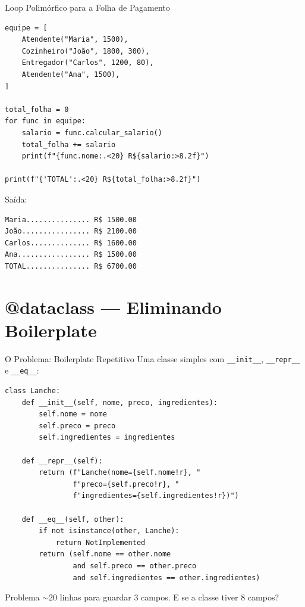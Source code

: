 \documentclass[aspectratio=169]{beamer}
\begin{document}
\begin{frame}[fragile,shrink=20]{Loop Polimórfico para a Folha de Pagamento}
  \begin{lstlisting}
equipe = [
    Atendente("Maria", 1500),
    Cozinheiro("João", 1800, 300),
    Entregador("Carlos", 1200, 80),
    Atendente("Ana", 1500),
]

total_folha = 0
for func in equipe:
    salario = func.calcular_salario()
    total_folha += salario
    print(f"{func.nome:.<20} R${salario:>8.2f}")

print(f"{'TOTAL':.<20} R${total_folha:>8.2f}")
  \end{lstlisting}

  Saída:
  \begin{lstlisting}[numbers=none]
Maria............... R$ 1500.00
João................ R$ 2100.00
Carlos.............. R$ 1600.00
Ana................. R$ 1500.00
TOTAL............... R$ 6700.00
  \end{lstlisting}
\end{frame}


\section{@dataclass --- Eliminando Boilerplate}

\begin{frame}[fragile,shrink=25]{O Problema: Boilerplate Repetitivo}
Uma classe simples com \texttt{\_\_init\_\_}, \texttt{\_\_repr\_\_} e \texttt{\_\_eq\_\_}:

\begin{lstlisting}
class Lanche:
    def __init__(self, nome, preco, ingredientes):
        self.nome = nome
        self.preco = preco
        self.ingredientes = ingredientes

    def __repr__(self):
        return (f"Lanche(nome={self.nome!r}, "
                f"preco={self.preco!r}, "
                f"ingredientes={self.ingredientes!r})")

    def __eq__(self, other):
        if not isinstance(other, Lanche):
            return NotImplemented
        return (self.nome == other.nome
                and self.preco == other.preco
                and self.ingredientes == other.ingredientes)
\end{lstlisting}

\begin{alertblock}{Problema}
$\sim$20 linhas para guardar 3 campos. E se a classe tiver 8 campos?
\end{alertblock}
\end{frame}
\end{document}
